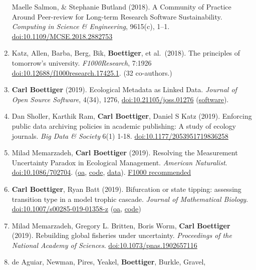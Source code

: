\documentclass[10pt,sans]{moderncv}        %
\begin{document}
\begin{enumerate}
  Maelle Salmon, \& Stephanie Butland (2018). A Community of Practice
  Around Peer-review for Long-term Research Software Sustainability.
  \emph{Computing in Science \& Engineering}, 9615(c), 1--1.
  \href{https://doi.org/10.1109/MCSE.2018.2882753}{doi:10.1109/MCSE.2018.2882753}
\item
  Katz, Allen, Barba, Berg, Bik, \textbf{Boettiger}, et al.~(2018). The
  principles of tomorrow's university. \emph{F1000Research}, 7:1926
  \href{https://doi.org/10.12688/f1000research.17425.1}{doi:10.12688/f1000research.17425.1}.
  (32 co-authors.)
\item
  \textbf{Carl Boettiger} (2019). Ecological Metadata as Linked Data.
  \emph{Journal of Open Source Software}, 4(34), 1276,
  \href{https://doi.org/10.21105/joss.01276}{doi:10.21105/joss.01276}
  (\href{https://doi.org/10.5281/zenodo.1442890}{software}).
\item
  Dan Sholler, Karthik Ram, \textbf{Carl Boettiger}, Daniel S Katz
  (2019). Enforcing public data archiving policies in academic
  publishing: A study of ecology journals. \emph{Big Data \& Society}
  6(1) 1-18.
  \href{https://doi.org/10.1177/2053951719836258}{doi:10.1177/2053951719836258}
\item
  Milad Memarzadeh, \textbf{Carl Boettiger} (2019). Resolving the
  Measurement Uncertainty Paradox in Ecological Management.
  \emph{American Naturalist}.
  \href{https://doi.org/10.1086/702704}{doi:10.1086/702704}.
  (\href{https://github.com/boettiger-lab/pomdp-intro/tree/master/manuscripts}{oa},
  \href{https://github.com/boettiger-lab/pomdp-intro}{code},
  \href{https://doi.org/10.5281/zenodo.2528507}{data}).
  \href{https://f1000.com/prime/735582387}{F1000 recommended}
\item
  \textbf{Carl Boettiger}, Ryan Batt (2019). Bifurcation or state
  tipping: assessing transition type in a model trophic cascade.
  \emph{Journal of Mathematical Biology}.
  \href{https://doi.org/10.1007/s00285-019-01358-z}{doi:10.1007/s00285-019-01358-z}
  (\href{https://github.com/cboettig/bs-tipping/blob/master/paper/paper.pdf}{oa},
  \href{https://github.com/cboettig/bs-tipping}{code})
\item
  Milad Memarzadeh, Gregory L. Britten, Boris Worm, \textbf{Carl
  Boettiger} (2019). Rebuilding global fisheries under uncertainty.
  \emph{Proceedings of the National Academy of Sciences}.
  \href{https://doi.org/10.1073/pnas.1902657116}{doi:10.1073/pnas.1902657116}
\item
  de Aguiar, Newman, Pires, Yeakel, \textbf{Boettiger}, Burkle, Gravel,

\end{enumerate}
\end{document}
